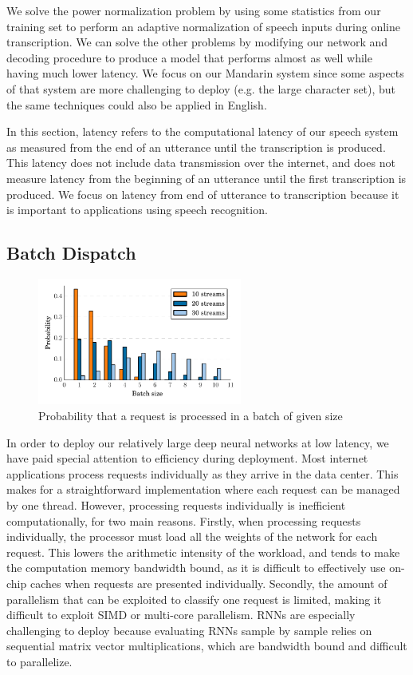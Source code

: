 \documentclass{article}
\begin{document}
We solve the power normalization problem by using some statistics from our training set to perform an adaptive normalization of speech inputs during online transcription. We can solve the other problems by modifying our network and decoding procedure to produce a model that performs almost as well while having much lower latency. We focus on our Mandarin system since some aspects of that system are more challenging to deploy (e.g. the large character set), but the same techniques could also be applied in English.

In this section, latency refers to the computational latency of our speech system as measured from the end of an utterance until the transcription is produced. This latency does not include data transmission over the internet, and does not measure latency from the beginning of an utterance until the first transcription is produced. We focus on latency from end of utterance to transcription because it is important to applications using speech recognition.

\subsection{Batch Dispatch}
\label{subsection:batching}

\begin{figure}
\centering
\includegraphics[width=0.6\textwidth]{batching.pdf}
\caption{Probability that a request is processed in a batch of given size}
\label{fig:batching}
\end{figure}

In order to deploy our relatively large deep neural networks at low latency, we have paid special attention to efficiency during deployment. Most internet applications process requests individually as they arrive in the data center. This makes for a straightforward implementation where each request can be managed by one thread. However, processing requests individually is inefficient computationally, for two main reasons. Firstly, when processing requests individually, the processor must load all the weights of the network for each request. This lowers the arithmetic intensity of the workload, and tends to make the computation memory bandwidth bound, as it is difficult to effectively use on-chip caches when requests are presented individually. Secondly, the amount of parallelism that can be exploited to classify one request is limited, making it difficult to exploit SIMD or multi-core parallelism. RNNs are especially challenging to deploy because evaluating RNNs sample by sample relies on sequential matrix vector multiplications, which are bandwidth bound and difficult to parallelize.
\end{document}
